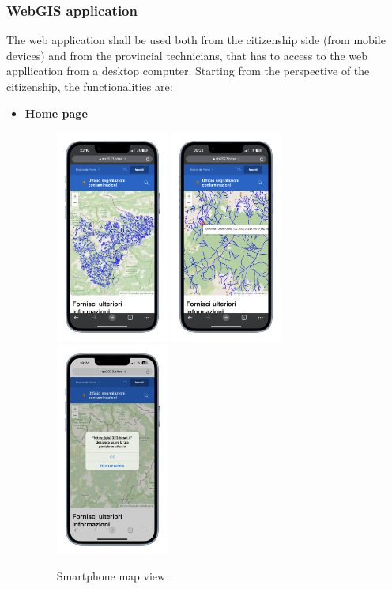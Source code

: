 \subsubsection{WebGIS application}
The web application shall be used both from the citizenship side (from mobile devices) and from the provincial technicians, that has to access to the web appllication from a desktop computer.
Starting from the perspective of the citizenship, the functionalities are:
\begin{itemize}
    \vspace{3ex}
    \item \textbf{Home page} \\
    \begin{figure}[H]\centering \includegraphics[width=10em]{img/home.png} \includegraphics[width=10em]{img/posizione.png} \includegraphics[width=10em]{img/autoposizione.png}  \caption{Smartphone map view} \label{phoneHomepage}\end{figure}

\end{itemize}
